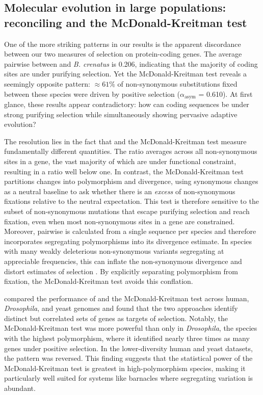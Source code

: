 \subsection*{Molecular evolution in large populations: reconciling \dnds{} and the
McDonald-Kreitman test}\label{sec:discussion_dnds_mkt}

One of the more striking patterns in our results is the apparent discordance between
our two measures of selection on protein-coding genes.
The average pairwise \dnds{} between \bgla{} and \textit{B. crenatus} is 0.206,
indicating that the majority of coding sites are under purifying selection.
Yet the McDonald-Kreitman test reveals a seemingly opposite pattern: $\approx61\%$
of non-synonymous substitutions fixed between these species were driven by
positive selection ($\alpha_\text{asym}$ = 0.610).
At first glance, these results appear contradictory: how can coding sequences be
under strong purifying selection while simultaneously showing pervasive adaptive
evolution?
\vspace{0.1cm}

The resolution lies in the fact that \dnds{} and the McDonald-Kreitman test measure
fundamentally different quantities. The \dnds{} ratio averages across all
non-synonymous sites in a gene, the vast majority of which are under functional
constraint, resulting in a ratio well below one. In contrast, the McDonald-Kreitman
test partitions changes into polymorphism and divergence, using synonymous changes
as a neutral baseline to ask whether there is an \textit{excess} of non-synonymous
fixations relative to the neutral expectation. This test is therefore sensitive to
the subset of non-synonymous mutations that escape purifying selection and reach
fixation, even when most non-synonymous sites in a gene are constrained.
Moreover, pairwise \dnds{} is calculated from a single sequence per species and
therefore incorporates segregating polymorphisms into its divergence estimate. In
species with many weakly deleterious non-synonymous variants segregating at
appreciable frequencies, this can inflate the non-synonymous divergence and distort
estimates of selection \citep{li_reverse_2008}. By explicitly separating
polymorphism from fixation, the McDonald-Kreitman test avoids this conflation.
\vspace{0.1cm}

\citet{li_reverse_2008} compared the performance of \dnds{} and the McDonald-Kreitman
test across human, \textit{Drosophila}, and yeast genomes and found that the two
approaches identify distinct but correlated sets of genes as targets of selection.
Notably, the McDonald-Kreitman test was more powerful than \dnds{} only in
\textit{Drosophila}, the species with the highest polymorphism, where it
identified nearly three times as many genes under positive selection. In the
lower-diversity human and yeast datasets, the pattern was reversed. This finding
suggests that the statistical power of the McDonald-Kreitman test is greatest in
high-polymorphism species, making it particularly well suited for systems like
barnacles where segregating variation is abundant.
\vspace{0.1cm}

